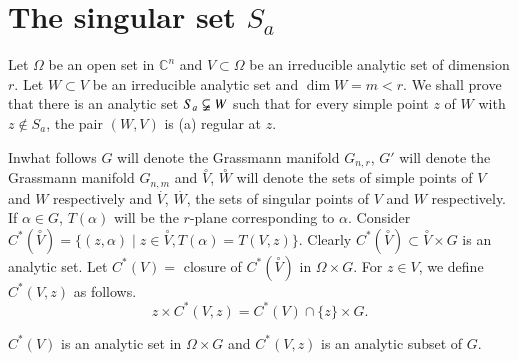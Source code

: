 \section{The singular set $S_a$}\label{chap3-sec3}

Let $\Omega$ be an open set in  $\mathbb{C}^n$ and $V\subset \Omega$
be an irreducible analytic set of dimension $r$. Let $W \subset V$ be
an irreducible analytic set and $\dim W=m<r$. We shall prove that
there is an analytic set
$S_a\varsubsetneqq W$ such that for
every simple point $z$ of $W$ with $z \notin S_a$, the pair $(W,V)$
is (a) regular at $z$. 

In\pageoriginale what follows $G$ will denote the Grassmann manifold
$G_{n,r}$, $G'$ 
will denote the Grassmann manifold $G_{n,m}$ and $\overset{\circ}{V}$,
$\overset{\circ}{W}$ will denote the sets of simple points of $V$ and $W$
respectively and $\overset{.}{V}$, $\overset{.}{W}$, the sets of
singular points of $V$ and $W$ respectively. If $\alpha \in G$,
$T(\alpha)$ will be the $r$-plane corresponding to $\alpha$. Consider
$C^* (\overset{\circ}{V}) = \{(z,\alpha)\mid z\in
\overset{\circ}{V}, T(\alpha) = T(V,z)\}$. Clearly $C^*
(\overset{\circ}{V}) \subset \overset{\circ}{V} \times G$ is an
analytic set. Let $C^*(V) = $ closure of $C^* (\overset{\circ}{V})$ in
$\Omega \times G$. For $z\in V$, we define $C^*(V,z)$ as
follows. 
$$
z\times C^* (V,z) = C^* (V)\cap \{z\}\times G. 
$$

\begin{proposition}\label{chap3-prop4} %
$C^* (V)$ is an analytic set in $\Omega \times G$ and $C^*(V,z)$ is
  an analytic subset of $G$. 
\end{proposition}

